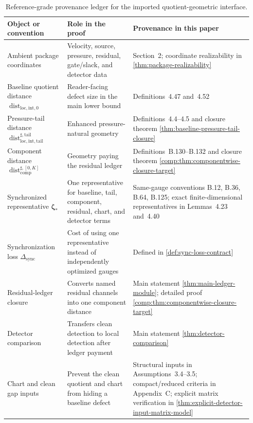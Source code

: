 \documentclass[11pt]{article}
\numberwithin{equation}{section}
\theoremstyle{definition}
\theoremstyle{remark}
\newcommand{\loc}{\mathrm{loc}}
\newcommand{\intg}{\mathrm{int}}
\newcommand{\tail}{\mathrm{tail}}
\newcommand{\comp}{\mathrm{comp}}
\newcommand{\sync}{\mathrm{sync}}
\newcommand{\Dist}{\operatorname{dist}}
\newcommand{\bzeta}{\boldsymbol\zeta}
\begin{document}
\begin{table}[h]
\centering
\small
\begin{tabular}{p{}p{}p{}}
\hline
\textbf{Object or convention} & \textbf{Role in the proof} & \textbf{Provenance in this paper} \\
\hline
Ambient package coordinates & Velocity, source, pressure, residual, gate/slack, and detector data & Section~2; coordinate realizability in \cref{thm:package-realizability} \\
Baseline quotient distance $\Dist_{\loc,\intg,0}$ & Reader-facing defect size in the main lower bound & Definitions~4.47 and~4.52 \\
Pressure-tail distance $\Dist_{\loc,\intg,\tail}^{\sharp,\tail}$ & Enhanced pressure-natural geometry & Definitions~4.4--4.5 and closure theorem \cref{thm:baseline-pressure-tail-closure} \\
Component distance $\Dist_{\comp}^{\sharp,[0,K]}$ & Geometry paying the residual ledger & Definitions~B.130--B.132 and closure theorem \cref{comp:thm:componentwise-closure-target} \\
Synchronized representative $\bzeta_*$ & One representative for baseline, tail, component, residual, chart, and detector terms & Same-gauge conventions B.12, B.36, B.64, B.125; exact finite-dimensional representatives in Lemmas~4.23 and~4.40 \\
Synchronization loss $\Delta_{\sync}$ & Cost of using one representative instead of independently optimized gauges & Defined in \cref{def:sync-loss-contract} \\
Residual-ledger closure & Converts named residual channels into one component distance & Main statement \cref{thm:main-ledger-module}; detailed proof \cref{comp:thm:componentwise-closure-target} \\
Detector comparison & Transfers clean detection to local detection after ledger payment & Main statement \cref{thm:detector-comparison} \\
Chart and clean gap inputs & Prevent the clean quotient and chart from hiding a baseline defect & Structural inputs in Assumptions~3.4--3.5; compact/reduced criteria in Appendix~C; explicit matrix verification in \cref{thm:explicit-detector-input-matrix-model} \\
\hline
\end{tabular}
\caption{Reference-grade provenance ledger for the imported quotient-geometric interface.}
\label{tab:imported-geometry-provenance}
\end{table}
\end{document}
